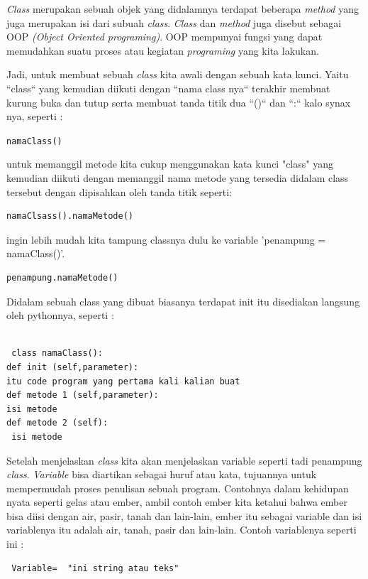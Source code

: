 \textit{Class} merupakan sebuah objek yang didalamnya terdapat beberapa \textit{method} yang juga merupakan isi dari subuah \textit{class}. \textit{Class} dan \textit{method} juga disebut sebagai OOP \textit{(Object Oriented programing)}. OOP mempunyai fungsi yang dapat memudahkan suatu proses atau kegiatan \textit{programing} yang kita lakukan.

Jadi, untuk membuat sebuah \textit{class} kita awali dengan sebuah kata kunci. Yaitu ``class`` yang kemudian diikuti dengan ``nama class nya`` terakhir membuat kurung buka dan tutup serta membuat tanda titik dua  ``()`` dan ``:`` kalo synax nya, seperti :


\verb|namaClass()|

untuk memanggil metode kita cukup menggunakan kata kunci "class" yang kemudian diikuti dengan memanggil nama metode yang tersedia didalam class tersebut dengan dipisahkan oleh tanda titik seperti:

\begin{verbatim}
namaClsass().namaMetode()
\end{verbatim}

ingin lebih mudah kita tampung classnya dulu ke variable 'penampung = namaClass()'.

\begin{verbatim}
penampung.namaMetode()
\end{verbatim}

Didalam sebuah class yang dibuat biasanya terdapat init itu disediakan langsung oleh pythonnya, seperti :


\begin{verbatim}

 class namaClass():
def init (self,parameter):
itu code program yang pertama kali kalian buat
def metode 1 (self,parameter):
isi metode
def metode 2 (self):
 isi metode

 \end{verbatim}

Setelah menjelaskan \textit{class} kita akan menjelaskan variable seperti tadi penampung \textit{class}. \textit{Variable} bisa diartikan sebagai huruf atau kata, tujuannya untuk mempermudah proses penulisan sebuah program. Contohnya dalam kehidupan nyata seperti gelas atau ember, ambil contoh ember kita ketahui bahwa ember bisa diisi dengan air, pasir, tanah dan lain-lain, ember itu sebagai variable dan isi variablenya itu adalah air, tanah, pasir dan lain-lain.
Contoh variablenya seperti ini :

\begin{verbatim}
 Variable=  "ini string atau teks"
\end{verbatim}

